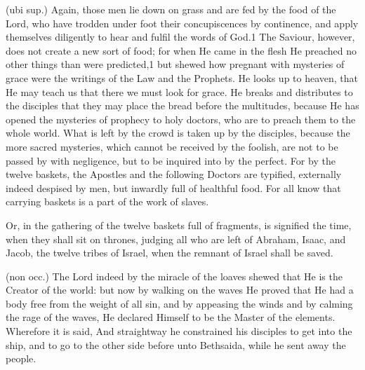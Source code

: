  (ubi sup.) Again, those men lie down on grass and are fed by the food of the Lord, who have trodden under foot their concupiscences by continence, and apply themselves diligently to hear and fulfil the words of God.1 The Saviour, however, does not create a new sort of food; for when He came in the flesh He preached no other things than were predicted,1 but shewed how pregnant with mysteries of grace were the writings of the Law and the Prophets. He looks up to heaven, that He may teach us that there we must look for grace. He breaks and distributes to the disciples that they may place the bread before the multitudes, because He has opened the mysteries of prophecy to holy doctors, who are to preach them to the whole world. What is left by the crowd is taken up by the disciples, because the more sacred mysteries, which cannot be received by the foolish, are not to be passed by with negligence, but to be inquired into by the perfect. For by the twelve baskets, the Apostles and the following Doctors are typified, externally indeed despised by men, but inwardly full of healthful food. For all know that carrying baskets is a part of the work of slaves.

 Or, in the gathering of the twelve baskets full of fragments, is signified the time, when they shall sit on thrones, judging all who are left of Abraham, Isaac, and Jacob, the twelve tribes of Israel, when the remnant of Israel shall be saved.

 

 (non occ.) The Lord indeed by the miracle of the loaves shewed that He is the Creator of the world: but now by walking on the waves He proved that He had a body free from the weight of all sin, and by appeasing the winds and by calming the rage of the waves, He declared Himself to be the Master of the elements. Wherefore it is said, And straightway he constrained his disciples to get into the ship, and to go to the other side before unto Bethsaida, while he sent away the people.

